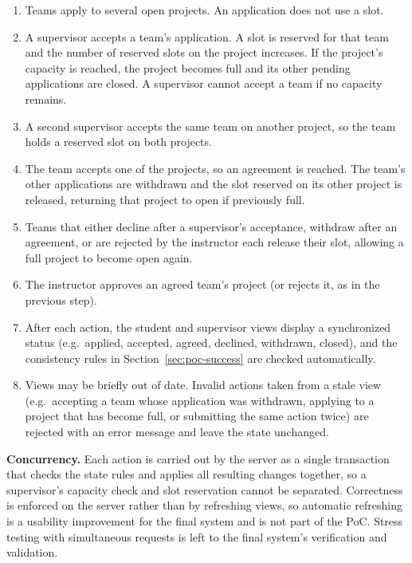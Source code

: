 \documentclass{article}
\begin{document}
\begin{enumerate}
    \item Teams apply to several open projects. An application does not use a
          slot.
    \item A supervisor accepts a team's application. A slot is reserved for that
          team and the number of reserved slots on the project increases. If the
          project's capacity is reached, the project becomes full and its other
          pending applications are closed. A supervisor cannot accept a team if
          no capacity remains.
    \item A second supervisor accepts the same team on another project, so the
          team holds a reserved slot on both projects.
    \item The team accepts one of the projects, so an agreement is reached. The
          team's other applications are withdrawn and the slot reserved on its
          other project is released, returning that project to open if previously full.
    \item Teams that either decline after a supervisor's acceptance, withdraw after an agreement,
          or are rejected by the instructor each release their slot, allowing a full project to
          become open again.
    \item The instructor approves an agreed team's project (or rejects it, as in
          the previous step).
    \item After each action, the student and supervisor views display a
          synchronized status (e.g.\ applied, accepted, agreed, declined,
          withdrawn, closed), and the consistency rules in
          Section~\ref{sec:poc-success} are checked automatically.
    \item Views may be briefly out of date. Invalid actions taken from a stale
          view (e.g.\ accepting a team whose application was withdrawn, applying
          to a project that has become full, or submitting the same action
          twice) are rejected with an error message and leave the state
          unchanged.
\end{enumerate}

\textbf{Concurrency.} Each action is carried out by the server as a single
transaction that checks the state rules and applies all resulting changes
together, so a supervisor's capacity check and slot reservation cannot be
separated. Correctness is enforced on the server rather than by refreshing
views, so automatic refreshing is a usability improvement for the final system
and is not part of the PoC. Stress testing with simultaneous requests is left
to the final system's verification and validation.
\end{document}
